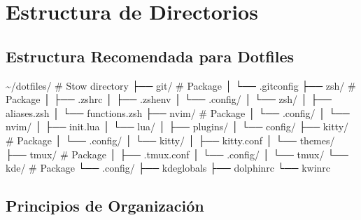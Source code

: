 \documentclass[
  doc,
  floatsintext,
  longtable,
  a4paper,
  nolmodern,
  notxfonts,
  notimes,
  12pt,
  colorlinks=true,linkcolor=blue,citecolor=blue,urlcolor=blue]{apa7}
\newenvironment{Shaded}{\begin{snugshade}}{\end{snugshade}}
\newcommand{\CommentTok}[1]{\textcolor[rgb]{0.37,0.37,0.37}{#1}}
\newcommand{\ExtensionTok}[1]{\textcolor[rgb]{0.00,0.23,0.31}{#1}}
\newcommand{\NormalTok}[1]{\textcolor[rgb]{0.00,0.23,0.31}{#1}}
\begin{document}
\section{Estructura de Directorios}\label{estructura-de-directorios}

\subsection{Estructura Recomendada para
Dotfiles}\label{estructura-recomendada-para-dotfiles}

\begin{Shaded}
\begin{Highlighting}[]
\ExtensionTok{\textasciitilde{}/dotfiles/}                    \CommentTok{\# Stow directory}
\ExtensionTok{├──}\NormalTok{ git/                       }\CommentTok{\# Package}
\ExtensionTok{│}\NormalTok{   └── .gitconfig}
\ExtensionTok{├──}\NormalTok{ zsh/                       }\CommentTok{\# Package}
\ExtensionTok{│}\NormalTok{   ├── .zshrc}
\ExtensionTok{│}\NormalTok{   ├── .zshenv}
\ExtensionTok{│}\NormalTok{   └── .config/}
\ExtensionTok{│}\NormalTok{       └── zsh/}
\ExtensionTok{│}\NormalTok{           ├── aliases.zsh}
\ExtensionTok{│}\NormalTok{           └── functions.zsh}
\ExtensionTok{├──}\NormalTok{ nvim/                      }\CommentTok{\# Package}
\ExtensionTok{│}\NormalTok{   └── .config/}
\ExtensionTok{│}\NormalTok{       └── nvim/}
\ExtensionTok{│}\NormalTok{           ├── init.lua}
\ExtensionTok{│}\NormalTok{           └── lua/}
\ExtensionTok{│}\NormalTok{               ├── plugins/}
\ExtensionTok{│}\NormalTok{               └── config/}
\ExtensionTok{├──}\NormalTok{ kitty/                     }\CommentTok{\# Package}
\ExtensionTok{│}\NormalTok{   └── .config/}
\ExtensionTok{│}\NormalTok{       └── kitty/}
\ExtensionTok{│}\NormalTok{           ├── kitty.conf}
\ExtensionTok{│}\NormalTok{           └── themes/}
\ExtensionTok{├──}\NormalTok{ tmux/                      }\CommentTok{\# Package}
\ExtensionTok{│}\NormalTok{   ├── .tmux.conf}
\ExtensionTok{│}\NormalTok{   └── .config/}
\ExtensionTok{│}\NormalTok{       └── tmux/}
\ExtensionTok{└──}\NormalTok{ kde/                       }\CommentTok{\# Package}
    \ExtensionTok{└──}\NormalTok{ .config/}
        \ExtensionTok{├──}\NormalTok{ kdeglobals}
        \ExtensionTok{├──}\NormalTok{ dolphinrc}
        \ExtensionTok{└──}\NormalTok{ kwinrc}
\end{Highlighting}
\end{Shaded}

\subsection{Principios de
Organización}\label{principios-de-organizaciuxf3n}
\end{document}
